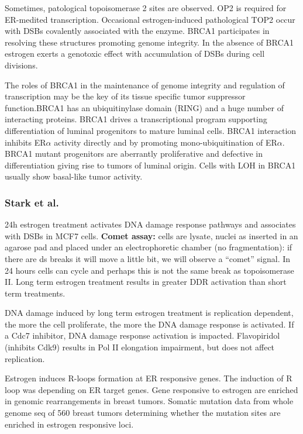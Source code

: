 Sometimes, patological topoisomerase 2 sites are observed. OP2 is required for ER-medited transcription. Occasional estrogen-induced pathological TOP2 occur with DSBs covalently associated with the enzyme. BRCA1 participates in resolving these structures promoting genome integrity. In the absence of BRCA1 estrogen exerts a genotoxic effect with accumulation of DSBs during cell divisions.

The roles of BRCA1 in the maintenance of genome integrity and regulation of transcription may be the key of its tissue specific tumor suppressor function.BRCA1 has an ubiquitinylase domain (RING) and a huge number of interacting proteins. BRCA1 drives a transcriptional program supporting differentiation of luminal progenitors to mature luminal cells. BRCA1 interaction inhibits ER$\alpha$ activity directly and by promoting mono-ubiquitination of ER$\alpha$. BRCA1 mutant progenitors are aberrantly proliferative and defective in differentiation giving rise to tumors of luminal origin. Cells with LOH in BRCA1 usually show basal-like tumor activity.

\hypertarget{stark-et-al.}{%
\subsubsection{Stark et al.}\label{stark-et-al.}}

24h estrogen treatment activates DNA damage response pathways and associates with DSBs in MCF7 cells. \textbf{Comet assay:} cells are lysate, nuclei as inserted in an agarose pad and placed under an electrophoretic chamber (no fragmentation): if there are ds breaks it will move a little bit, we will observe a ``comet'' signal. In 24 hours cells can cycle and perhaps this is not the same break as topoisomerase II. Long term estrogen treatment results in greater DDR activation than short term treatments.

DNA damage induced by long term estrogen treatment is replication dependent, the more the cell proliferate, the more the DNA damage response is activated. If a Cdc7 inhibitor, DNA damage response activation is impacted. Flavopiridol (inhibits Cdk9) results in Pol II elongation impairment, but does not affect replication.

Estrogen induces R-loops formation at ER responsive genes. The induction of R loop was depending on ER target genes. Gene responsive to estrogen are enriched in genomic rearrangements in breast tumors. Somatic mutation data from whole genome seq of 560 breast tumors determining whether the mutation sites are enriched in estrogen responsive loci.

